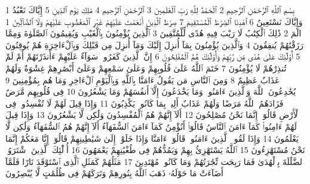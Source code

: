 {\tiny\colorbox{cl_aya}{1}} بِسْمِ ٱللَّهِ ٱلرَّحْمَٰنِ ٱلرَّحِيمِ
{\tiny\colorbox{cl_aya}{2}} ٱلْحَمْدُ لِلَّهِ رَبِّ ٱلْعَٰلَمِينَ
{\tiny\colorbox{cl_aya}{3}} ٱلرَّحْمَٰنِ ٱلرَّحِيمِ
{\tiny\colorbox{cl_aya}{4}} مَٰلِكِ يَوْمِ ٱلدِّينِ
{\tiny\colorbox{cl_aya}{5}} إِيَّاكَ نَعْبُدُ وَإِيَّاكَ نَسْتَعِينُ
{\tiny\colorbox{cl_aya}{6}} ٱهْدِنَا ٱلصِّرَٰطَ ٱلْمُسْتَقِيمَ
{\tiny\colorbox{cl_aya}{7}} صِرَٰطَ ٱلَّذِينَ أَنْعَمْتَ عَلَيْهِمْ غَيْرِ ٱلْمَغْضُوبِ عَلَيْهِمْ وَلَا ٱلضَّآلِّينَ
{\tiny\colorbox{cl_aya}{1}} الٓمٓ
{\tiny\colorbox{cl_aya}{2}} ذَٰلِكَ ٱلْكِتَٰبُ لَا رَيْبَ فِيهِ هُدًى لِّلْمُتَّقِينَ
{\tiny\colorbox{cl_aya}{3}} ٱلَّذِينَ يُؤْمِنُونَ بِٱلْغَيْبِ وَيُقِيمُونَ ٱلصَّلَوٰةَ وَمِمَّا رَزَقْنَٰهُمْ يُنفِقُونَ
{\tiny\colorbox{cl_aya}{4}} وَٱلَّذِينَ يُؤْمِنُونَ بِمَآ أُنزِلَ إِلَيْكَ وَمَآ أُنزِلَ مِن قَبْلِكَ وَبِٱلْءَاخِرَةِ هُمْ يُوقِنُونَ
{\tiny\colorbox{cl_aya}{5}} أُو۟لَٰٓئِكَ عَلَىٰ هُدًى مِّن رَّبِّهِمْ وَأُو۟لَٰٓئِكَ هُمُ ٱلْمُفْلِحُونَ
{\tiny\colorbox{cl_aya}{6}} إِنَّ ٱلَّذِينَ كَفَرُوا۟ سَوَآءٌ عَلَيْهِمْ ءَأَنذَرْتَهُمْ أَمْ لَمْ تُنذِرْهُمْ لَا يُؤْمِنُونَ
{\tiny\colorbox{cl_aya}{7}} خَتَمَ ٱللَّهُ عَلَىٰ قُلُوبِهِمْ وَعَلَىٰ سَمْعِهِمْ وَعَلَىٰٓ أَبْصَٰرِهِمْ غِشَٰوَةٌ وَلَهُمْ عَذَابٌ عَظِيمٌ
{\tiny\colorbox{cl_aya}{8}} وَمِنَ ٱلنَّاسِ مَن يَقُولُ ءَامَنَّا بِٱللَّهِ وَبِٱلْيَوْمِ ٱلْءَاخِرِ وَمَا هُم بِمُؤْمِنِينَ
{\tiny\colorbox{cl_aya}{9}} يُخَٰدِعُونَ ٱللَّهَ وَٱلَّذِينَ ءَامَنُوا۟ وَمَا يَخْدَعُونَ إِلَّآ أَنفُسَهُمْ وَمَا يَشْعُرُونَ
{\tiny\colorbox{cl_aya}{10}} فِى قُلُوبِهِم مَّرَضٌ فَزَادَهُمُ ٱللَّهُ مَرَضًا وَلَهُمْ عَذَابٌ أَلِيمٌۢ بِمَا كَانُوا۟ يَكْذِبُونَ
{\tiny\colorbox{cl_aya}{11}} وَإِذَا قِيلَ لَهُمْ لَا تُفْسِدُوا۟ فِى ٱلْأَرْضِ قَالُوٓا۟ إِنَّمَا نَحْنُ مُصْلِحُونَ
{\tiny\colorbox{cl_aya}{12}} أَلَآ إِنَّهُمْ هُمُ ٱلْمُفْسِدُونَ وَلَٰكِن لَّا يَشْعُرُونَ
{\tiny\colorbox{cl_aya}{13}} وَإِذَا قِيلَ لَهُمْ ءَامِنُوا۟ كَمَآ ءَامَنَ ٱلنَّاسُ قَالُوٓا۟ أَنُؤْمِنُ كَمَآ ءَامَنَ ٱلسُّفَهَآءُ أَلَآ إِنَّهُمْ هُمُ ٱلسُّفَهَآءُ وَلَٰكِن لَّا يَعْلَمُونَ
{\tiny\colorbox{cl_aya}{14}} وَإِذَا لَقُوا۟ ٱلَّذِينَ ءَامَنُوا۟ قَالُوٓا۟ ءَامَنَّا وَإِذَا خَلَوْا۟ إِلَىٰ شَيَٰطِينِهِمْ قَالُوٓا۟ إِنَّا مَعَكُمْ إِنَّمَا نَحْنُ مُسْتَهْزِءُونَ
{\tiny\colorbox{cl_aya}{15}} ٱللَّهُ يَسْتَهْزِئُ بِهِمْ وَيَمُدُّهُمْ فِى طُغْيَٰنِهِمْ يَعْمَهُونَ
{\tiny\colorbox{cl_aya}{16}} أُو۟لَٰٓئِكَ ٱلَّذِينَ ٱشْتَرَوُا۟ ٱلضَّلَٰلَةَ بِٱلْهُدَىٰ فَمَا رَبِحَت تِّجَٰرَتُهُمْ وَمَا كَانُوا۟ مُهْتَدِينَ
{\tiny\colorbox{cl_aya}{17}} مَثَلُهُمْ كَمَثَلِ ٱلَّذِى ٱسْتَوْقَدَ نَارًا فَلَمَّآ أَضَآءَتْ مَا حَوْلَهُۥ ذَهَبَ ٱللَّهُ بِنُورِهِمْ وَتَرَكَهُمْ فِى ظُلُمَٰتٍ لَّا يُبْصِرُونَ
